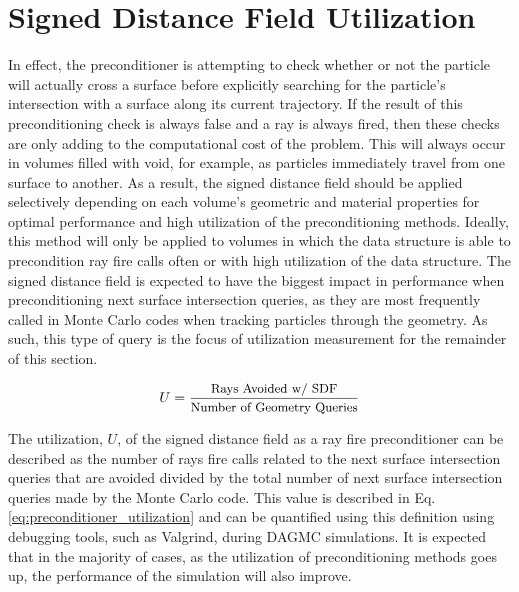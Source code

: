 \section{Signed Distance Field Utilization}\label{section:preconditioner_utilization}

In effect, the preconditioner is attempting to check whether or not the particle
will actually cross a surface before explicitly searching for the particle's
intersection with a surface along its current trajectory. If the result of this
preconditioning check is always false and a ray is always fired, then these
checks are only adding to the computational cost of the problem. This will
always occur in volumes filled with void, for example, as particles immediately
travel from one surface to another. As a result, the signed distance field
should be applied selectively depending on each volume's geometric and material
properties for optimal performance and high utilization of the preconditioning
methods. Ideally, this method will only be applied to volumes in which the data
structure is able to precondition ray fire calls often or with high utilization
of the data structure. The signed distance field is expected to have the biggest
impact in performance when preconditioning next surface intersection queries, as
they are most frequently called in Monte Carlo codes when tracking particles
through the geometry. As such, this type of query is the focus of utilization
measurement for the remainder of this section.

\begin{equation}
  U = \frac{ \small \text{Rays Avoided w/ SDF} }{ \small \text{Number of Geometry Queries} } 
   \label{eq:preconditioner_utilization}
\end{equation}

The utilization, $U$, of the signed distance field as a ray fire preconditioner can be
described as the number of rays fire calls related to the next surface
intersection queries that are avoided divided by the total number of next surface
intersection queries made by the Monte Carlo code. This value is described
in Eq. \ref{eq:preconditioner_utilization} and can be quantified using this
definition using debugging tools, such as Valgrind, during DAGMC simulations.
It is expected that in the majority of cases, as the utilization of preconditioning
methods goes up, the performance of the simulation will also improve.

